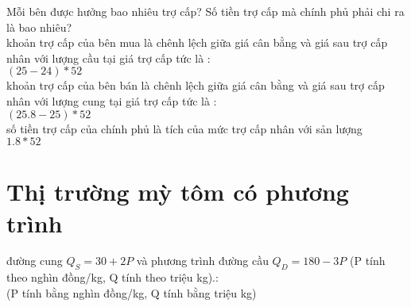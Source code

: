 \begin{enumerate}[a.]

        Mỗi bên được hưởng bao nhiêu trợ cấp? Số tiền trợ cấp mà chính phủ phải chi ra là bao
        nhiêu? \\
        khoản trợ cấp của bên mua là chênh lệch giữa giá cân bằng và giá sau trợ cấp nhân với lượng cầu tại giá trợ cấp tức là : \\
        $(25 - 24) * 52$ \\
        khoản trợ cấp của bên bán là chênh lệch giữa giá cân bằng và giá sau trợ cấp nhân với lượng cung tại giá trợ cấp tức là : \\
        $(25.8 - 25) * 52$ \\
        số tiền trợ cấp của chính phủ là tích của mức trợ cấp nhân với sản lượng \\
        $1.8 * 52$
        
\end{enumerate}


\section{Thị trường mỳ tôm có phương trình }
đường cung $Q_S = 30 + 2P$ và phương trình
đường cầu $Q_D = 180 - 3P$ (P tính theo nghìn đồng/kg, Q tính theo triệu kg).: \\
(P tính bằng nghìn đồng/kg, Q tính bằng triệu kg) \\

